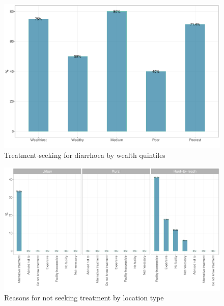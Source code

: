 \documentclass[12pt,a4paper]{article}
\begin{document}
\begin{figure}[H]

{\centering \includegraphics{kayahReport_files/figure-latex/diarrhoea2plot-1} 

}

\caption{Treatment-seeking for diarrhoea by wealth quintiles}\label{fig:diarrhoea2plot}
\end{figure}

\begin{figure}[H]

{\centering \includegraphics{kayahReport_files/figure-latex/diarrhoea3plot-1} 

}

\caption{Reasons for not seeking treatment by location type}\label{fig:diarrhoea3plot}
\end{figure}
\end{document}
